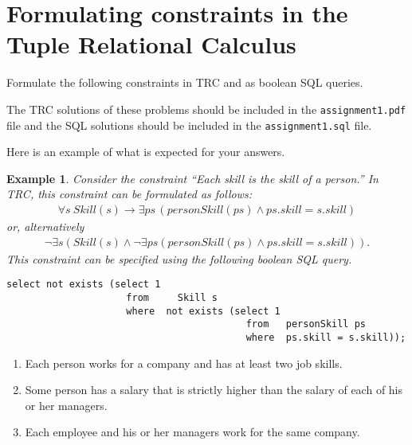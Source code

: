 \documentclass{article}
\newtheorem{example}{Example}
\begin{document}
\section{Formulating constraints in the Tuple Relational Calculus}

Formulate the following constraints in TRC and as boolean SQL queries.    

The TRC solutions of these problems should be included in the {\tt assignment1.pdf} file and
the SQL solutions should be included in the {\tt assignment1.sql} file.

Here is an example of what is expected for your answers.

\begin{example}
Consider the constraint ``\emph{Each skill is the skill of a person.}''
In TRC, this constraint can be formulated as follows:
$$
\begin{array}{l}
\forall s\ Skill(s) \rightarrow \exists ps\, (personSkill(ps) \land ps.skill = s.skill)
\end{array}
$$
or, alternatively
$$
\begin{array}{l}
\lnot \exists s (Skill(s) \land \lnot \exists ps (personSkill(ps) \land ps.skill = s.skill)).
\end{array}
$$
This constraint can be specified using the following boolean SQL query.
\begin{verbatim}
select not exists (select 1
      	      	     from	  Skill	s
      	      	     where  not exists (select 1
      	      	      	      	          from   personSkill ps
      	      	      	      	          where  ps.skill = s.skill));
\end{verbatim}

\end{example}


\begin{enumerate}[resume]

\item  Each person works for a company and has at least two job skills.

\item  Some person has a salary that is strictly higher than the salary of each of his or her managers.


\item  Each employee and his or her managers work for the same company.


\end{enumerate}
\end{document}
